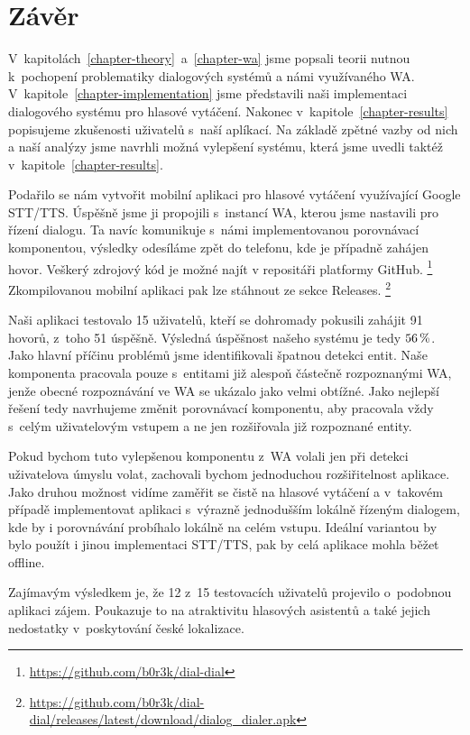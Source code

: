 \chapter*{Závěr}

V~kapitolách~\ref{chapter-theory}~a~\ref{chapter-wa} jsme popsali teorii nutnou
k~pochopení problematiky dialogových systémů a námi využívaného WA.
V~kapitole~\ref{chapter-implementation} jsme představili naši
implementaci dialogového systému pro hlasové vytáčení.
Nakonec v~kapitole~\ref{chapter-results} popisujeme zkušenosti
uživatelů s~naší aplíkací. Na základě zpětné vazby od nich a naší analýzy jsme navrhli možná
vylepšení systému, která jsme uvedli taktéž v~kapitole~\ref{chapter-results}.

Podařilo se nám vytvořit mobilní aplikaci pro hlasové vytáčení využívající
Google STT/TTS. Úspěšně jsme ji propojili
s~instancí WA, kterou jsme nastavili pro řízení dialogu. Ta navíc komunikuje s~námi
implementovanou porovnávací komponentou, výsledky odesíláme zpět do telefonu,
kde je případně zahájen hovor. Veškerý zdrojový kód
je možné najít v repositáři platformy GitHub.%
\footnote{\url{https://github.com/b0r3k/dial-dial}}
Zkompilovanou mobilní aplikaci pak lze stáhnout ze sekce Releases.%
\footnote{\url{https://github.com/b0r3k/dial-dial/releases/latest/download/dialog_dialer.apk}}

Naši aplikaci testovalo 15 uživatelů, kteří se dohromady pokusili zahájit 91 hovorů,
z~toho 51 úspěšně. Výsledná úspěšnost našeho systému je tedy \(56\,\rm \%\).
Jako hlavní příčinu problémů jsme identifikovali špatnou detekci entit.
Naše komponenta pracovala pouze s~entitami již alespoň částečně rozpoznanými
WA, jenže obecné rozpoznávání ve WA se ukázalo jako velmi obtížné. Jako nejlepší
řešení tedy navrhujeme změnit porovnávací komponentu, aby pracovala vždy s~celým
uživatelovým vstupem a ne jen rozšiřovala již rozpoznané entity.

Pokud bychom tuto vylepšenou komponentu z~WA volali jen při detekci uživatelova
úmyslu volat, zachovali bychom jednoduchou rozšiřitelnost aplikace. Jako
druhou možnost vidíme zaměřit se čistě na hlasové vytáčení a v~takovém
případě implementovat aplikaci s~výrazně jednodušším lokálně řízeným
dialogem, kde by i porovnávání probíhalo lokálně na celém vstupu. Ideální
variantou by bylo použít i jinou implementaci STT/TTS, pak by
celá aplikace mohla běžet offline.

Zajímavým výsledkem je, že 12 z~15 testovacích uživatelů projevilo o~podobnou
aplikaci zájem. Poukazuje to na atraktivitu hlasových asistentů
a také jejich nedostatky v~poskytování české lokalizace.